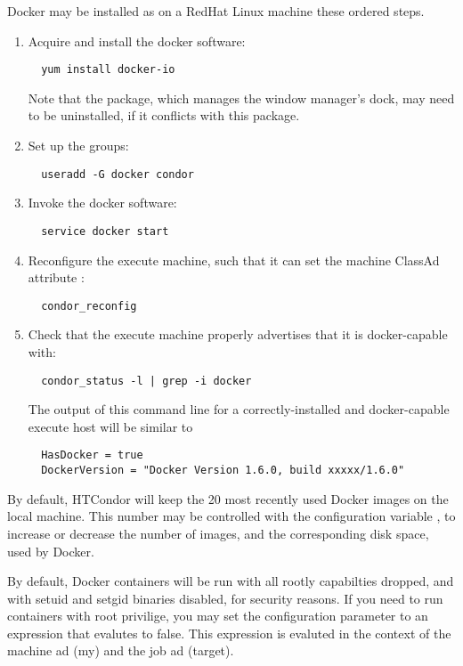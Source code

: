 Docker may be installed as  on a RedHat Linux machine these
ordered steps.
\begin{enumerate}
\item
Acquire and install the docker software:
\begin{verbatim}
  yum install docker-io
\end{verbatim}
Note that the  package,
which manages the window manager's dock,
 may need to be uninstalled,
if it conflicts with this  package.
\item
Set up the groups:
\begin{verbatim}
  useradd -G docker condor
\end{verbatim}
\item
Invoke the docker software:
\begin{verbatim}
  service docker start
\end{verbatim}
\item
Reconfigure the execute machine, such that it can set the machine ClassAd
attribute :
\begin{verbatim}
  condor_reconfig
\end{verbatim}
\item
Check that the execute machine properly advertises that it is docker-capable
with:
\begin{verbatim}
  condor_status -l | grep -i docker
\end{verbatim}
The output of this command line for a correctly-installed and 
docker-capable execute host will be similar to
\begin{verbatim}
  HasDocker = true
  DockerVersion = "Docker Version 1.6.0, build xxxxx/1.6.0"
\end{verbatim}
\end{enumerate}

By default, HTCondor will keep the 20 most recently used Docker images
on the local machine.  This number may be controlled with the configuration
variable , 
to increase or decrease the number
of images, and the corresponding disk space, used by Docker.

By default, Docker containers will be run with all rootly capabilties dropped,
and with setuid and setgid binaries disabled, for security reasons. If  you
need to run containers with root privilige, you may set the configuration
parameter  to an expression that
evalutes to false.  This expression is evaluted in the context of the machine ad (my) and the job ad (target).

